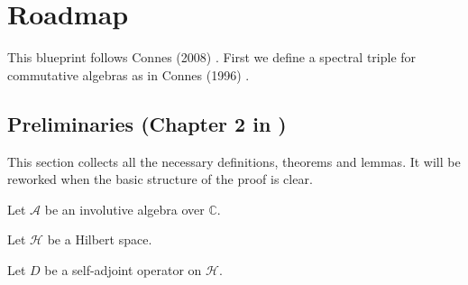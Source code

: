 %


\newcommand{\ncint}{\mathchoice{\int\!\!\!\!\!\!-\!}{\int\!\!\!\!-\!}{\int\!\!-\!}{\int\!-\!}}

\chapter{Roadmap}
This blueprint follows Connes (2008) \cite{Connes2008}. First we define a spectral triple for commutative algebras as in Connes (1996) \cite{Connes1996}.


\section{Preliminaries (Chapter 2 in \cite{Connes2008})} 
This section collects all the necessary definitions, theorems and lemmas. It will be reworked when the basic structure of the proof is clear.

\begin{definition}\label{def:involutive-algebra}
    Let $\mathcal{A}$ be an involutive algebra over $\mathbb{C}$.
\end{definition}

\begin{definition}\label{def:hilbert-space}
    Let $\mathcal{H}$ be a Hilbert space.
\end{definition}


\begin{definition}\label{def:self-adjoint-operator}
    Let $D$ be a self-adjoint operator on $\mathcal{H}$.
\end{definition}

